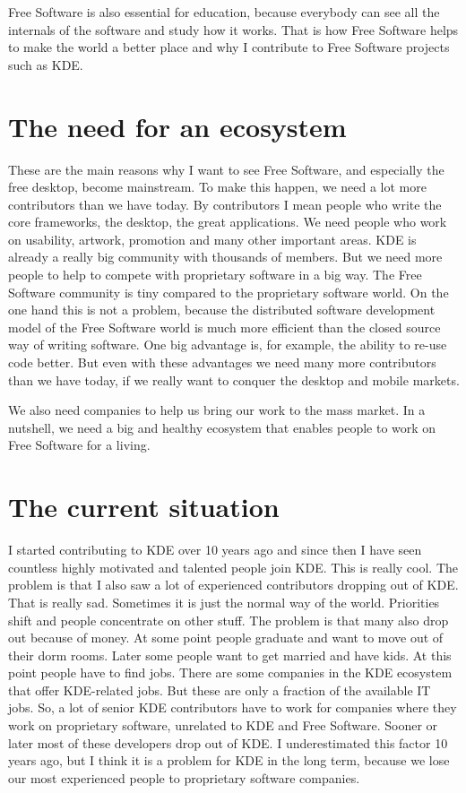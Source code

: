 Free Software is also essential for education, because everybody can see all the
internals of the software and study how it works. That is how Free Software helps to
make the world a better place and why I contribute to Free Software projects
such as KDE. 

\section*{The need for an ecosystem}

These are the main reasons why I want to see Free Software, and especially the
free desktop, become mainstream. To make this happen, we need a lot more
contributors than we have today. By contributors I mean people who write the
core frameworks, the desktop, the great applications. We need people who work on
usability, artwork, promotion and many other important areas. KDE is already a
really big community with thousands of members. But we need more people to help 
to compete with proprietary software in a big way. The Free Software community
is tiny compared to the proprietary software world. On the one hand this is not
a problem, because the distributed software development model of the Free
Software world is much more efficient than the closed source way of writing
software. One big advantage is, for example, the ability to re-use code better.
But even with these advantages we need many more contributors than we have
today, if we really want to conquer the desktop and mobile markets.

We also need companies to help us bring our work to the mass market. In a
nutshell, we need a big and healthy ecosystem that enables people to work on
Free Software for a living.

\section*{The current situation}

I started contributing to KDE over 10 years ago and since then I have seen
countless highly motivated and talented people join KDE. This is really cool.
The problem is that I also saw a lot of experienced contributors dropping out of
KDE. That is really sad. Sometimes it is just the normal way of the world.
Priorities shift and people concentrate on other stuff. The problem is that many
also drop out because of money. At some point people graduate and want to move
out of their dorm rooms. Later some people want to get married and have kids. At
this point people have to find jobs. There are some companies in the KDE
ecosystem that offer KDE-related jobs. But these are only a fraction of the
available IT jobs. So, a lot of senior KDE contributors have to work for
companies where they work on proprietary software, unrelated to KDE and Free
Software. Sooner or later most of these developers drop out of KDE.
I underestimated this factor 10 years ago, but I think it is a problem for KDE
in the long term, because we lose our most experienced people to proprietary
software companies.

